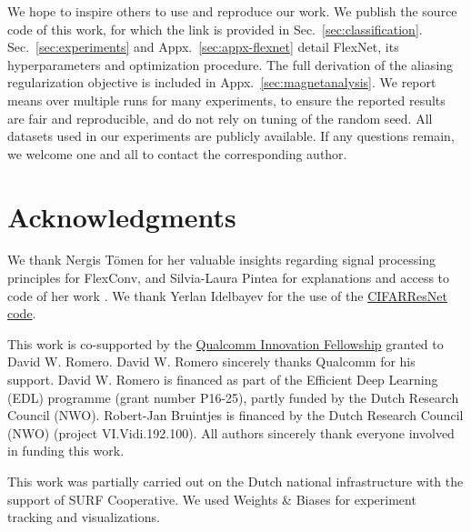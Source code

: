 \documentclass{article} \usepackage{iclr2022_conference,times}
\begin{document}
We hope to inspire others to use and reproduce our work. We publish the source code of this work, for which the link is provided in Sec.~\ref{sec:classification}. Sec.~\ref{sec:experiments} and Appx.~\ref{sec:appx-flexnet} detail FlexNet, its hyperparameters and optimization procedure. The full derivation of the aliasing regularization objective is included in Appx.~\ref{sec:magnetanalysis}. We report means over multiple runs for many experiments, to ensure the reported results are fair and reproducible, and do not rely on tuning of the random seed. All datasets used in our experiments are publicly available. If any questions remain, we welcome one and all to contact the corresponding author.

\section*{Acknowledgments}
We thank Nergis Tömen for her valuable insights regarding signal processing principles for FlexConv, and Silvia-Laura Pintea for explanations and access to code of her work \cite{pintea2021resolution}.  We thank Yerlan Idelbayev for the use of the \href{https://github.com/akamaster/pytorch_resnet_cifar10}{CIFARResNet code}.

This work is co-supported by the \href{https://www.qualcomm.com/research/research/university-relations/innovation-fellowship/2021-europe}{Qualcomm Innovation Fellowship} granted to David W. Romero. David W. Romero sincerely thanks Qualcomm for his support. David W. Romero is financed as part of the Efficient Deep Learning (EDL) programme (grant number P16-25), partly funded by the Dutch Research Council (NWO). Robert-Jan Bruintjes is financed by the Dutch Research Council (NWO) (project VI.Vidi.192.100). All authors sincerely thank everyone involved in funding this work.

This work was partially carried out on the Dutch national infrastructure with the support of SURF Cooperative. We used Weights \& Biases \citep{wandb} for experiment tracking and visualizations.




\newpage
\appendix
\end{document}
